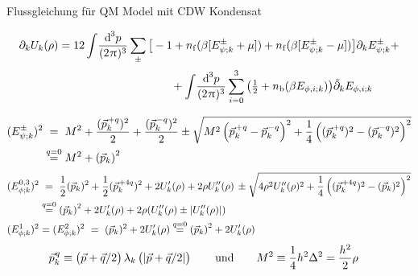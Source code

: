 \begin{frame}{Flussgleichung für QM Model mit CDW Kondensat}
	\label{cdwFlow}
	\hspace*{-1.5em}
	\begin{minipage}{\textwidth}
		\footnotesize\vspace{-0.15cm}
		\begin{align*}
			\partial_k U_k(\rho)&=12\int\! \frac{\dif^{\, 3}\!p}{(2\piu)^3}\sum_{\pm}\big[-1+\nf(\beta [E_{\psi;k}^\pm+\mu])+\nf(\beta [E_{\psi;k}^\pm-\mu])\big]\partial_k E_{\psi;k}^\pm+\notag\\[.1em]
			&\qquad\qquad\qquad\qquad\qquad +\int\! \frac{\dif^{\, 3}\!p}{(2\piu)^3}\sum_{i=0}^3\big(\tfrac{1}{2}+\nb(\beta E_{\phi,i;k})\big)\tilde{\partial}_k E_{\phi,i;k}
		\end{align*}\vspace{-0.4cm}

		\begin{align*}
			(E_{\psi;k}^\pm)^2&\stackrel{\phantom{q=0}}{=}M^2+\frac{(\vec{p}_k^{\mkern 2mu +q})^2}{2} +\frac{(\vec{p}_k^{\mkern 2mu -q})^2}{ 2}\pm\sqrt{M^2\del{\vec{p}_k^{\mkern 2mu +q}-\vec{p}_k^{\mkern 2mu -q}}^2+\frac{1}{4}\del{(\vec{p}_k^{\mkern 2mu +q})^2 -(\vec{p}_k^{\mkern 2mu -q})^2 }^2}\\
			&\stackrel{q=0}{=} M^2+\del{\vec{p}_k}^2
		\end{align*}\vspace{-0.4cm}
		\begin{align*}
			(E_{\phi;k}^{0,3})^2&\stackrel{\phantom{q=0}}{=}\frac{1}{2 }(\vec{p}_k)^2 +\frac{1}{2 }(\vec{p}_k^{\mkern 2mu+4q})^2+2U_k'(\rho) +2\rho U_k''(\rho)\,
			\pm \sqrt{4\rho^2 U_k''(\rho)^2+\frac{1}{4}\del{(\vec{p}_k^{\mkern 2mu+4q})^2-(\vec{p}_k)^2 }^2}\\
			&\stackrel{q=0}{=}\del{\vec{p}_k}^2+2U_k'(\rho)+2\rho (U_k''(\rho)\pm|U_k''(\rho)|)\\
			(E_{\phi;k}^{1})^2&=(E_{\phi;k}^{2})^2\stackrel{\phantom{q=0}}{=}(\vec{p}_k)^2+2U_k'(\rho)\stackrel{q=0}{=}\del{\vec{p}_k}^2+2U_k'(\rho)
		\end{align*}\vspace{-0.4cm}
		\begin{align*}
			\vec{p}_k^{\mkern 2mu q}&\equiv\del{\vec p + {\vec q/ 2}}\lambda_k\del{|\vec p + {\vec q/ 2}|}\qquad\text{und}\qquad
			M^2\equiv \frac{1}{4} h^2 \Delta^2=\frac{h^2}{2}\rho
		\end{align*}
	\end{minipage}
	
\end{frame}


